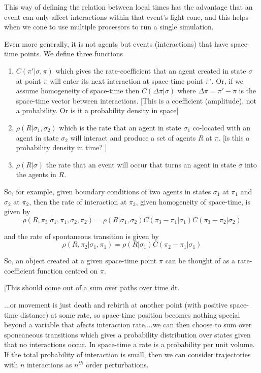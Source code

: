 \documentclass[a4paper]{article}
\begin{document}
This way of defining the relation between local times has the advantage that an event can only affect interactions within that event's light cone, and this helps when we cone to use multiple processors to run a single simulation.

Even more generally, it is not agents but events (interactions) that have space-time points. We define three functions
\begin{enumerate}
	\item $C(\pi' | \sigma, \pi)$ which gives the rate-coefficient that an agent created in state $\sigma$ at point $\pi$ will enter its next interaction at space-time point $\pi'$. Or, if we assume homogeneity of space-time then $C(\Delta\pi | \sigma)$ where $\Delta\pi = \pi' - \pi$ is the space-time vector between interactions. [This is a coefficient (amplitude), not a probability. Or is it a probability density in space]

	\item $\rho(R | \sigma_1, \sigma_2)$ which is the rate that an agent in state $\sigma_1$ co-located with an agent in state $\sigma_2$ will interact and produce a set of agents $R$ at $\pi$. [is this a probability density in time? ]
	
	\item $\rho(R | \sigma)$ the rate that an event will occur that turns an agent in state $\sigma$ into the agents in $R$.
\end{enumerate}	

So, for example, given boundary conditions of two agents in states $\sigma_1$ at $\pi_1$ and $\sigma_2$ at $\pi_2$, then the rate of interaction at $\pi_3$, given homogeneity of space-time, is given by
\[
\rho(R, \pi_3 | \sigma_1, \pi_1, \sigma_2, \pi_2) = \rho(R | \sigma_1, \sigma_2)C(\pi_3 - \pi_1 | \sigma_1)C(\pi_3 - \pi_2 | \sigma_2)
\]

and the rate of spontaneous transition is given by
\[
\rho(R, \pi_2 | \sigma_1, \pi_1) = \rho(R | \sigma_1)C(\pi_2 - \pi_1 | \sigma_1)
\]

So, an object created at a given space-time point $\pi$ can be thought of as a rate-coefficient function centred on $\pi$. 

[This should come out of a sum over paths over time dt.

...or movement is just death and rebirth at another point (with positive space-time distance) at some rate, so space-time position becomes nothing special beyond a variable that afects interaction rate....we can then choose to sum over sponeaneous transitions which gives a probability distribution over states given that no interactions occur. In space-time a rate is a probability per unit volume. If the total probability of interaction is small, then we can consider trajectories with $n$ interactions as $n^{th}$ order perturbations.
\end{document}
